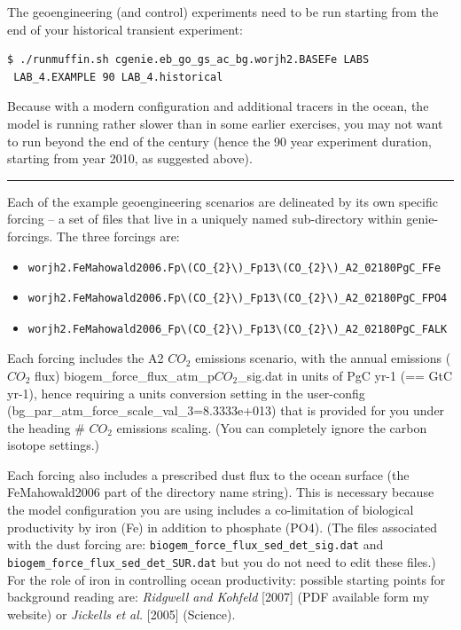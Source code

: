 \documentclass[11pt,fleqn]{book} %
\begin{document}
The geoengineering (and control) experiments need to be run starting from the end of your historical transient experiment:
\begin{verbatim}
$ ./runmuffin.sh cgenie.eb_go_gs_ac_bg.worjh2.BASEFe LABS
 LAB_4.EXAMPLE 90 LAB_4.historical
\end{verbatim}
Because with a modern configuration and additional tracers in the ocean, the model is running rather slower than in some earlier exercises, you may not want to run beyond the end of the century (hence the 90 year experiment duration, starting from year 2010, as suggested above).

\vspace{1mm}
\noindent\rule{4cm}{0.1mm}
\vspace{2mm}

\noindent Each of the example geoengineering scenarios are delineated by its own specific forcing – a set of files that live in a uniquely named sub-directory within genie-forcings. The three forcings are:

\vspace{2mm}
\begin{itemize}[noitemsep]
\item 
\begin{verbatim}worjh2.FeMahowald2006.Fp\(CO_{2}\)_Fp13\(CO_{2}\)_A2_02180PgC_FFe\end{verbatim}
\item 
\begin{verbatim}worjh2.FeMahowald2006.Fp\(CO_{2}\)_Fp13\(CO_{2}\)_A2_02180PgC_FPO4\end{verbatim}
\item 
\begin{verbatim}worjh2.FeMahowald2006_Fp\(CO_{2}\)_Fp13\(CO_{2}\)_A2_02180PgC_FALK\end{verbatim}
\end{itemize}
\vspace{2mm}
   
Each forcing includes the A2 \(CO_{2}\) emissions scenario, with the annual emissions (\(CO_{2}\) flux) biogem\_force\_flux\_atm\_p\(CO_{2}\)\_sig.dat in units of PgC yr-1 (== GtC yr-1), hence requiring a units conversion setting in the user-config (bg\_par\_atm\_force\_scale\_val\_3=8.3333e+013) that is provided for you under the heading \# \(CO_{2}\) emissions scaling. (You can completely ignore the carbon isotope settings.)

Each forcing also includes a prescribed dust flux to the ocean surface (the FeMahowald2006 part of the directory name string). This is necessary because the model configuration you are using includes a co-limitation of biological productivity by iron (Fe) in addition to phosphate (PO4). (The files associated with the dust forcing are: \texttt{biogem\_force\_flux\_sed\_det\_sig.dat} and \texttt{biogem\_force\_flux\_sed\_det\_SUR.dat} but you do not need to edit these files.) For the role of iron in controlling ocean productivity: possible starting points for background reading are: \textit{Ridgwell and Kohfeld} [2007] (PDF available form my website) or \textit{Jickells et al.} [2005] (Science).
\end{document}
